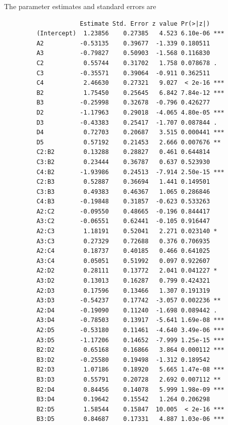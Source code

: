 \documentclass{article}
\begin{document}
    The parameter estimates and standard errors are
    \begin{verbatim}
                     Estimate Std. Error z value Pr(>|z|)    
         (Intercept)  1.23856    0.27385   4.523 6.10e-06 ***
         A2          -0.53135    0.39677  -1.339 0.180511    
         A3          -0.79827    0.50903  -1.568 0.116830    
         C2           0.55744    0.31702   1.758 0.078678 .  
         C3          -0.35571    0.39064  -0.911 0.362511    
         C4           2.46630    0.27321   9.027  < 2e-16 ***
         B2           1.75450    0.25645   6.842 7.84e-12 ***
         B3          -0.25998    0.32678  -0.796 0.426277    
         D2          -1.17963    0.29018  -4.065 4.80e-05 ***
         D3          -0.43383    0.25417  -1.707 0.087844 .  
         D4           0.72703    0.20687   3.515 0.000441 ***
         D5           0.57192    0.21453   2.666 0.007676 ** 
         C2:B2        0.13288    0.28827   0.461 0.644814    
         C3:B2        0.23444    0.36787   0.637 0.523930    
         C4:B2       -1.93986    0.24513  -7.914 2.50e-15 ***
         C2:B3        0.52887    0.36694   1.441 0.149501    
         C3:B3        0.49383    0.46367   1.065 0.286846    
         C4:B3       -0.19848    0.31857  -0.623 0.533263    
         A2:C2       -0.09550    0.48665  -0.196 0.844417    
         A3:C2       -0.06551    0.62441  -0.105 0.916447    
         A2:C3        1.18191    0.52041   2.271 0.023140 *  
         A3:C3        0.27329    0.72688   0.376 0.706935    
         A2:C4        0.18737    0.40185   0.466 0.641025    
         A3:C4        0.05051    0.51992   0.097 0.922607    
         A2:D2        0.28111    0.13772   2.041 0.041227 *  
         A3:D2        0.13013    0.16287   0.799 0.424321    
         A2:D3        0.17596    0.13466   1.307 0.191319    
         A3:D3       -0.54237    0.17742  -3.057 0.002236 ** 
         A2:D4       -0.19090    0.11240  -1.698 0.089442 .  
         A3:D4       -0.78503    0.13917  -5.641 1.69e-08 ***
         A2:D5       -0.53180    0.11461  -4.640 3.49e-06 ***
         A3:D5       -1.17206    0.14652  -7.999 1.25e-15 ***
         B2:D2        0.65168    0.16866   3.864 0.000112 ***
         B3:D2       -0.25580    0.19498  -1.312 0.189542    
         B2:D3        1.07186    0.18920   5.665 1.47e-08 ***
         B3:D3        0.55791    0.20728   2.692 0.007112 ** 
         B2:D4        0.84456    0.14078   5.999 1.98e-09 ***
         B3:D4        0.19642    0.15542   1.264 0.206298    
         B2:D5        1.58544    0.15847  10.005  < 2e-16 ***
         B3:D5        0.84687    0.17331   4.887 1.03e-06 ***

\end{verbatim}
\end{document}
